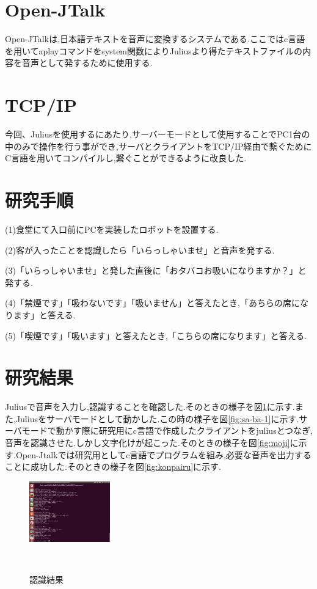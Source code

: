 \documentclass[11pt]{si2016}
\begin{document}
\section{Open-JTalk}
Open-JTalkは,日本語テキストを音声に変換するシステムである.ここではc言語を用いてaplayコマンドをsystem関数によりJuliusより得たテキストファイルの内容を音声として発するために使用する.


\section{TCP/IP}
今回、Juliusを使用するにあたり,サーバーモードとして使用することでPC1台の中のみで操作を行う事ができ,サーバとクライアントをTCP/IP経由で繋ぐためにC言語を用いてコンパイルし,繋ぐことができるように改良した.


\section{研究手順}
(1)食堂にて入口前にPCを実装したロボットを設置する.


(2)客が入ったことを認識したら「いらっしゃいませ」と音声を発する.


(3)「いらっしゃいませ」と発した直後に「おタバコお吸いになりますか？」と発する.


(4)「禁煙です」「吸わないです」「吸いません」と答えたとき,「あちらの席になります」と答える.


(5)「喫煙です」「吸います」と答えたとき,「こちらの席になります」と答える.


\section{研究結果}
Juliusで音声を入力し,認識することを確認した.そのときの様子を図\ref{fig:ninshiki}に示す.また,Juliusをサーバモードとして動かした.この時の様子を図\ref{fig:sa-ba-1}に示す.サーバモードで動かす際に研究用にc言語で作成したクライアントをjuliusとつなぎ,音声を認識させた.しかし文字化けが起こった.そのときの様子を図\ref{fig:moji}に示す.Open-Jtalkでは研究用としてc言語でプログラムを組み,必要な音声を出力することに成功した.そのときの様子を図\ref{fig:konpairu}に示す.


\begin{figure}[h]
 \begin{center}
  \includegraphics[width=35mm]{img/ninshiki.png}
 　\caption{認識結果}
 　\label{fig:ninshiki}
 \end{center}
\end{figure}
\end{document}

